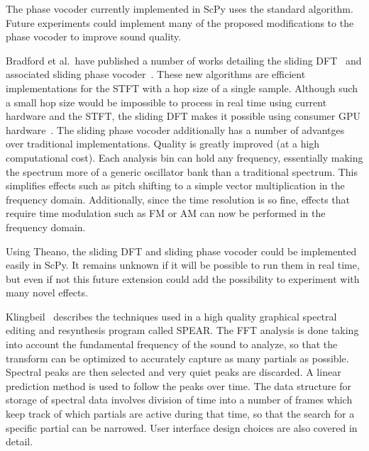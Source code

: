 \documentclass{article}
\begin{document}
The phase vocoder currently implemented in ScPy uses the standard algorithm. Future experiments
could implement many of the proposed modifications to the phase vocoder to improve sound quality.
\\\par
Bradford et al.\ have published a number of works detailing the sliding
DFT~\cite{bradford2005sliding} and associated sliding phase vocoder~\cite{bradford2007sliding}.
These new algorithms are efficient implementations for the STFT with a hop size of a single sample.
Although such a small hop size would be impossible to process in real time using current hardware
and the STFT, the sliding DFT makes it possible using consumer GPU
hardware~\cite{bradford2011real}. The sliding phase vocoder additionally has a number of advantges
over traditional implementations. Quality is greatly improved (at a high computational cost). Each
analysis bin can hold any frequency, essentially making the spectrum more of a generic oscillator
bank than a traditional spectrum. This simplifies effects such as pitch shifting to a simple vector
multiplication in the frequency domain. Additionally, since the time resolution is so fine, effects
that require time modulation such as FM or AM can now be performed in the frequency domain.

Using Theano, the sliding DFT and sliding phase vocoder could be implemented easily in ScPy. It
remains unknown if it will be possible to run them in real time, but even if not this future
extension could add the possibility to experiment with many novel effects.
\\\par
Klingbeil~\cite{klingbeil2005software} describes the techniques used in a high quality graphical
spectral editing and resynthesis program called SPEAR\@. The FFT analysis is done taking into
account the fundamental frequency of the sound to analyze, so that the transform can be optimized
to accurately capture as many partials as possible. Spectral peaks are then selected and very quiet
peaks are discarded. A linear prediction method is used to follow the peaks over time. The data
structure for storage of spectral data involves division of time into a number of frames which keep
track of which partials are active during that time, so that the search for a specific partial can
be narrowed. User interface design choices are also covered in detail.
\end{document}
